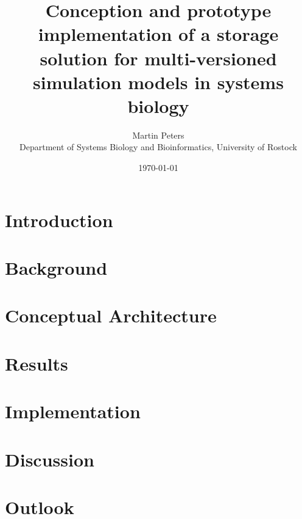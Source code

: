 \documentclass[12pt, a4paper, titlepage]{book}
\title{Conception and prototype implementation of a storage solution for multi-versioned simulation models in systems biology}
\author{Martin Peters\\ \small Department of Systems Biology and Bioinformatics, University of Rostock}
\date{\today}
\begin{document}
	\maketitle
	\tableofcontents
	
	\chapter{Introduction}
	
	
	\chapter{Background}
	
	
	\chapter{Conceptual Architecture}
	
	
	\chapter{Results}
	
	
	\chapter{Implementation}
	
	
	\chapter{Discussion}
	
	
	\chapter{Outlook}
	
	
	
	
	
	\begin{appendix}
		\listoffigures
	\end{appendix}
\end{document}
